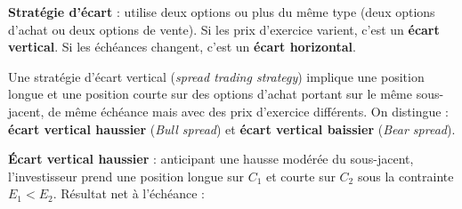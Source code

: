 \begin{f}
\textbf{Stratégie d'écart} : utilise deux options ou plus du même type (deux options d'achat ou deux options de vente).  
Si les prix d'exercice varient, c'est un \textbf{écart vertical}.  
Si les échéances changent, c'est un \textbf{écart horizontal}.

Une stratégie d’écart vertical (\textit{spread trading strategy}) implique une position longue et une position courte sur des options d’achat portant sur le même sous-jacent, de même échéance mais avec des prix d’exercice différents.  
On distingue : \textbf{écart vertical haussier} (\textit{Bull spread}) et \textbf{écart vertical baissier} (\textit{Bear spread}).

\textbf{Écart vertical haussier} : anticipant une hausse modérée du sous-jacent, l’investisseur prend une position longue sur \(C_1\) et courte sur \(C_2\) sous la contrainte \(E_1 < E_2\).  
Résultat net à l’échéance :


\end{f}
